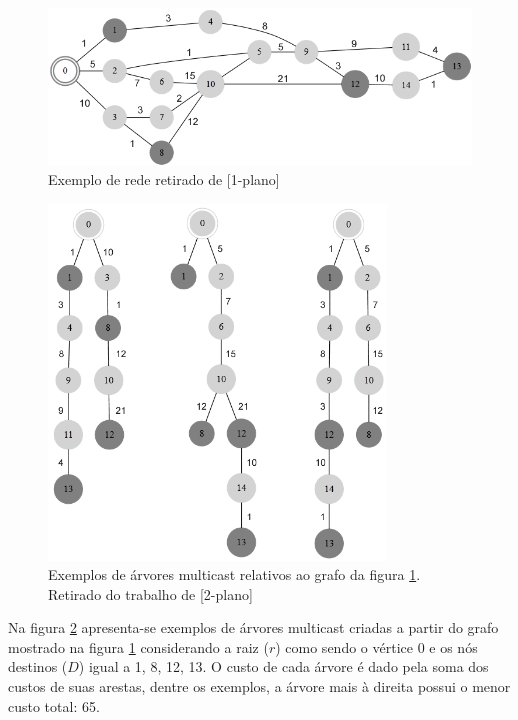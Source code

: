 \begin{figure}
	\label{fig_prm_grafo}
	\caption{Exemplo de rede retirado de [1-plano]}
	\centering
	\includegraphics[width=1\textwidth]{cap_problemas/figs/prm_grafo}
\end{figure}

\begin{figure}
	\label{fig_prm_mono}
	\caption{Exemplos de árvores multicast relativos ao grafo da figura \ref{fig_prm_grafo}. Retirado do trabalho de [2-plano]}
	\centering
	\includegraphics[width=0.8\textwidth]{cap_problemas/figs/prm_mono}
\end{figure}

Na figura \ref{fig_prm_mono} apresenta-se exemplos de árvores multicast criadas a partir do grafo mostrado na figura \ref{fig_prm_grafo} considerando a raiz ($r$) como sendo o vértice 0 e os nós destinos ($D$) igual a {1, 8, 12, 13}. O custo de cada árvore é dado pela soma dos custos de suas arestas, dentre os exemplos, a árvore mais à direita possui o menor custo total: 65.

